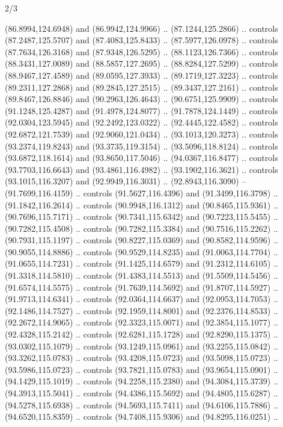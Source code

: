 \begin{flagdescription}{2/3}
\begin{scope}[shift={(0.5\flaglength,0.5)},scale=\flagwidth/320]
\begin{scope}[y=0.8pt, x=0.8pt, yscale=-1,shift={(-118.3,-146)}]
  (86.8994,124.6948) and (86.9942,124.9966) .. (87.1244,125.2866) .. controls
  (87.2487,125.5707) and (87.4083,125.8433) .. (87.5977,126.0978) .. controls
  (87.7634,126.3168) and (87.9348,126.5295) .. (88.1123,126.7366) .. controls
  (88.3431,127.0089) and (88.5857,127.2695) .. (88.8284,127.5299) .. controls
  (88.9467,127.4589) and (89.0595,127.3933) .. (89.1719,127.3223) .. controls
  (89.2311,127.2868) and (89.2845,127.2515) .. (89.3437,127.2161) .. controls
  (89.8467,126.8846) and (90.2963,126.4643) .. (90.6751,125.9909) .. controls
  (91.1248,125.4287) and (91.4978,124.8077) .. (91.7878,124.1449) .. controls
  (92.0304,123.5945) and (92.2492,123.0322) .. (92.4445,122.4582) .. controls
  (92.6872,121.7539) and (92.9060,121.0434) .. (93.1013,120.3273) .. controls
  (93.2374,119.8243) and (93.3735,119.3154) .. (93.5096,118.8124) .. controls
  (93.6872,118.1614) and (93.8650,117.5046) .. (94.0367,116.8477) .. controls
  (93.7703,116.6643) and (93.4861,116.4982) .. (93.1902,116.3621) .. controls
  (93.1015,116.3207) and (92.9949,116.3031) .. (92.8943,116.3090) --
  (91.7699,116.4159) .. controls (91.5627,116.4396) and (91.3499,116.3798) ..
  (91.1842,116.2614) .. controls (90.9948,116.1312) and (90.8465,115.9361) ..
  (90.7696,115.7171) .. controls (90.7341,115.6342) and (90.7223,115.5455) ..
  (90.7282,115.4508) .. controls (90.7282,115.3384) and (90.7516,115.2262) ..
  (90.7931,115.1197) .. controls (90.8227,115.0369) and (90.8582,114.9596) ..
  (90.9055,114.8886) .. controls (90.9529,114.8235) and (91.0063,114.7704) ..
  (91.0655,114.7231) .. controls (91.1425,114.6579) and (91.2312,114.6105) ..
  (91.3318,114.5810) .. controls (91.4383,114.5513) and (91.5509,114.5456) ..
  (91.6574,114.5575) .. controls (91.7639,114.5692) and (91.8707,114.5927) ..
  (91.9713,114.6341) .. controls (92.0364,114.6637) and (92.0953,114.7053) ..
  (92.1486,114.7527) .. controls (92.1959,114.8001) and (92.2376,114.8533) ..
  (92.2672,114.9065) .. controls (92.3323,115.0071) and (92.3854,115.1077) ..
  (92.4328,115.2142) .. controls (92.6281,115.1728) and (92.8290,115.1375) ..
  (93.0302,115.1079) .. controls (93.1249,115.0961) and (93.2255,115.0842) ..
  (93.3262,115.0783) .. controls (93.4208,115.0723) and (93.5098,115.0723) ..
  (93.5986,115.0723) .. controls (93.7821,115.0783) and (93.9654,115.0901) ..
  (94.1429,115.1019) .. controls (94.2258,115.2380) and (94.3084,115.3739) ..
  (94.3913,115.5041) .. controls (94.4386,115.5692) and (94.4805,115.6287) ..
  (94.5278,115.6938) .. controls (94.5693,115.7411) and (94.6106,115.7886) ..
  (94.6520,115.8359) .. controls (94.7408,115.9306) and (94.8295,116.0251) ..

\end{scope}
\end{scope}
\end{flagdescription}
